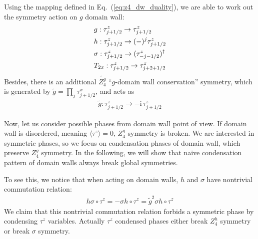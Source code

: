 \documentclass[reprint,amsmath,amssymb,aps,pra,]{revtex4-1}
\newcommand{\ii}{\mathrm{i}\,} %
\newcommand{\dg}{\dagger}
\begin{document}

Using the mapping defined in Eq.~(\ref{eq:z4_dw_duality}), we are able to work out the symmetry action on $g$ domain wall:
\begin{align}
  &g:\tau^z_{j+1/2}\rightarrow \tau^z_{j+1/2}\notag\\
  &h:\tau^z_{j+1/2}\rightarrow (-)^j\tau^z_{j+1/2}\notag\\
  &\sigma:\tau^z_{j+1/2}\rightarrow (\tau^z_{-j-1/2})^\dg\notag\\
  &T_{2x}:\tau^z_{j+1/2}\rightarrow \tau^z_{j+2+1/2}
  \label{eq:z4_dw_sym_action}
\end{align}
Besides, there is an additional $\widetilde{Z_4^g}$ ``$g$-domain wall conservation'' symmetry, which is generated by $\widetilde{g}=\prod_j\tau^x_{j+1/2}$, and acts as
\begin{align}
  \widetilde{g}: \tau^z_{j+1/2}\rightarrow-\ii\tau^z_{j+1/2}
  \label{}
\end{align}

Now, let us consider possible phases from domain wall point of view.
If domain wall is disordered, meaning $\langle\tau^z\rangle=0$, $Z_4^g$ symmetry is broken.
We are interested in symmetric phases, so we focus on condensation phases of domain wall, which preserve $Z_4^g$ symmetry.
In the following, we will show that naive condensation pattern of domain walls always break global symmetries.

To see this, we notice that when acting on domain walls, $h$ and $\sigma$ have nontrivial commutation relation:
\begin{align}
  h\sigma\circ\tau^z=-\sigma h\circ\tau^z=\widetilde{g}^2 \sigma h\circ\tau^z
  \label{eq:dw_z4P_proj_rep}
\end{align}
We claim that this nontrivial commutation relation forbids a symmetric phase by condensing $\tau^z$ variables. 
Actually $\tau^z$ condensed phases either break $Z_4^h$ symmetry or break $\sigma$ symmetry.
\end{document}
